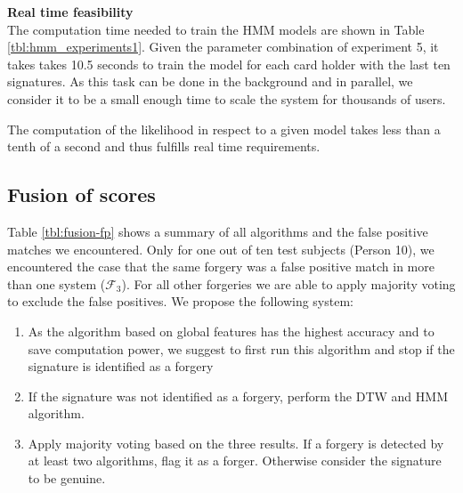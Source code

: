\documentclass[a4paper, oneside]{csthesis}
\begin{document}
\textbf{Real time feasibility}\\
The computation time needed to train the HMM models are shown in Table \ref{tbl:hmm_experiments1}. Given the parameter combination of experiment 5, it takes takes 10.5 seconds to train the model for each card holder with the last ten signatures. As this task can be done in the background and in parallel, we consider it to be a small enough time to scale the system for thousands of users.

The computation of the likelihood in respect to a given model takes less than a tenth of a second and thus fulfills real time requirements.


\newpage
\subsection{Fusion of scores}

Table \ref{tbl:fusion-fp} shows a summary of all algorithms and the false positive matches we encountered. Only for one out of ten test subjects (Person 10), we encountered the case that the same forgery was a false positive match in more than one system ($\mathcal{F}_3$). For all other forgeries we are able to apply majority voting to exclude the false positives. We propose the following system:

\begin{enumerate}
\item As the algorithm based on global features has the highest accuracy and to save computation power, we suggest to first run this algorithm and stop if the signature is identified as a forgery
\item If the signature was not identified as a forgery, perform the DTW and HMM algorithm.
\item Apply majority voting based on the three results. If a forgery is detected by at least two algorithms, flag it as a forger. Otherwise consider the signature to be genuine.
\end{enumerate}
\end{document}

